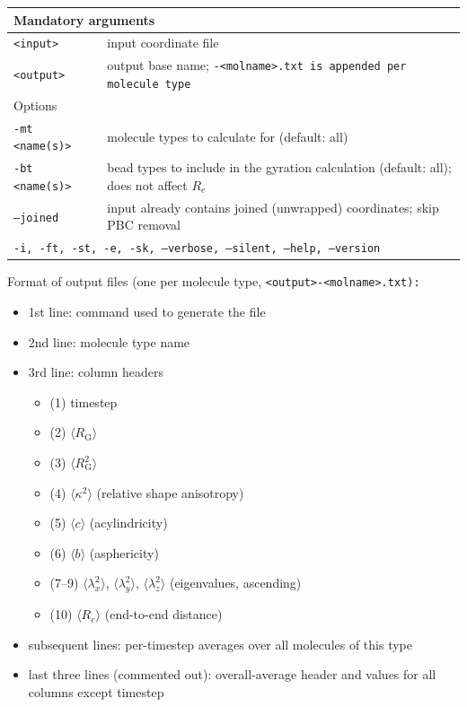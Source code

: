\noindent
\begin{longtable}{p{}p{}}
  \toprule
  \multicolumn{2}{l}{Mandatory arguments}\\
  \midrule
  \tt{<input>}  & input coordinate file\\
  \tt{<output>} & output base name; \tt{-<molname>.txt} is appended per
                  molecule type\\
  \toprule
  \multicolumn{2}{l}{Options}\\
  \midrule
  \tt{-mt <name(s)>} & molecule types to calculate for (default: all)\\
  \tt{-bt <name(s)>} & bead types to include in the gyration calculation
                       (default: all); does not affect $R_e$\\
  \tt{--joined}      & input already contains joined (unwrapped) coordinates;
                       skip PBC removal\\
  \midrule
  \multicolumn{2}{p{0.948\textwidth}}{\tt{-i}, \tt{-ft}, \tt{-st}, \tt{-e},
    \tt{-sk}, \tt{--verbose}, \tt{--silent}, \tt{--help}, \tt{--version}}\\
  \bottomrule
\end{longtable}

\noindent
Format of output files (one per molecule type, \tt{<output>-<molname>.txt}):
\begin{itemize}[nosep,leftmargin=5pt]
  \item 1st line: command used to generate the file
  \item 2nd line: molecule type name
  \item 3rd line: column headers
    \begin{itemize}[nosep,leftmargin=10pt]
      \item (1) timestep
      \item (2) $\langle R_\mathrm{G} \rangle$
      \item (3) $\langle R_\mathrm{G}^2 \rangle$
      \item (4) $\langle \kappa^2 \rangle$ (relative shape anisotropy)
      \item (5) $\langle c \rangle$ (acylindricity)
      \item (6) $\langle b \rangle$ (asphericity)
      \item (7--9) $\langle \lambda_x^2 \rangle$, $\langle \lambda_y^2 \rangle$,
        $\langle \lambda_z^2 \rangle$ (eigenvalues, ascending)
      \item (10) $\langle R_e \rangle$ (end-to-end distance)
    \end{itemize}
  \item subsequent lines: per-timestep averages over all molecules of this type
  \item last three lines (commented out): overall-average header and values for
    all columns except timestep
\end{itemize}
